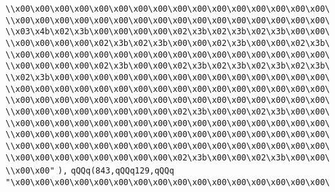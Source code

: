\verb|\\x00\x00\x00\x00\x00\x00\x00\x00\x00\x00\x00\x00\x00\x00\x00\x00\|\newline
\verb|\\x00\x00\x00\x00\x00\x00\x00\x00\x00\x00\x00\x00\x00\x00\x00\x00\|\newline
\verb|\\x03\x4b\x02\x3b\x00\x00\x00\x00\x02\x3b\x02\x3b\x02\x3b\x00\x00\|\newline
\verb|\\x00\x00\x00\x00\x02\x3b\x02\x3b\x00\x00\x02\x3b\x00\x00\x02\x3b\|\newline
\verb|\\x00\x00\x00\x00\x00\x00\x00\x00\x00\x00\x00\x00\x00\x00\x00\x00\|\newline
\verb|\\x00\x00\x00\x00\x02\x3b\x00\x00\x02\x3b\x02\x3b\x02\x3b\x02\x3b\|\newline
\verb|\\x02\x3b\x00\x00\x00\x00\x00\x00\x00\x00\x00\x00\x00\x00\x00\x00\|\newline
\verb|\\x00\x00\x00\x00\x00\x00\x00\x00\x00\x00\x00\x00\x00\x00\x00\x00\|\newline
\verb|\\x00\x00\x00\x00\x00\x00\x00\x00\x00\x00\x00\x00\x00\x00\x00\x00\|\newline
\verb|\\x00\x00\x00\x00\x00\x00\x00\x00\x02\x3b\x00\x00\x02\x3b\x00\x00\|\newline
\verb|\\x00\x00\x00\x00\x00\x00\x00\x00\x00\x00\x00\x00\x00\x00\x00\x00\|\newline
\verb|\\x00\x00\x00\x00\x00\x00\x00\x00\x00\x00\x00\x00\x00\x00\x00\x00\|\newline
\verb|\\x00\x00\x00\x00\x00\x00\x00\x00\x00\x00\x00\x00\x00\x00\x00\x00\|\newline
\verb|\\x00\x00\x00\x00\x00\x00\x00\x00\x02\x3b\x00\x00\x02\x3b\x00\x00\|\newline
\verb|\\x00\x00"|\newline
\verb|),|\newline
\verb|qQQq(843,qQQq129,qQQq|\newline
\verb|"\x00\x00\x00\x00\x00\x00\x00\x00\x00\x00\x00\x00\x00\x00\x00\x00\|\newline
